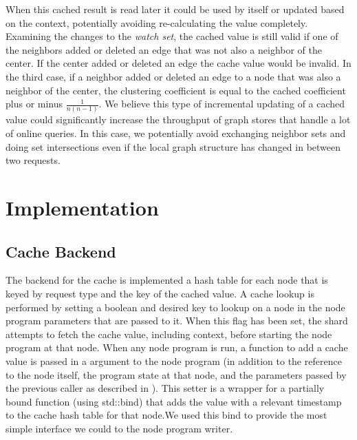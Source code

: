 \documentclass[letterpaper,twocolumn,11pt,tight]{article}
\begin{document}
    When this cached result is read later it could be used by itself or updated based on the context, potentially avoiding re-calculating the value completely. Examining the changes to the \emph{watch set}, the cached value is still valid if one of the neighbors added or deleted an edge that was not also a neighbor of the center. If the center added or deleted an edge the cache value would be invalid. In the third case, if a neighbor added or deleted an edge to a node that was also a neighbor of the center, the clustering coefficient is equal to the cached coefficient plus or minus $\frac1{n(n-1)}$. 
We believe this type of incremental updating of a cached value could significantly increase the throughput of graph stores that handle a lot of online queries. In this case, we potentially avoid exchanging neighbor sets and doing set intersections even if the local graph structure has changed in between two requests.

\section{Implementation}\label{sec:design}
\subsection{Cache Backend}
The backend for the cache is implemented a hash table for each node that is keyed by request type and the key of the cached value. A cache lookup is performed by setting a boolean and desired key to lookup on a node in the node program parameters that are passed to it.
When this flag has been set, the shard attempts to fetch the cache value, including context, before starting the node program at that node. When any node program is run, a function to add a cache value is passed in a argument to the node program (in addition to the reference to the node itself, the program state at that node, and the parameters passed by the previous caller as described in ). This setter is a wrapper for a partially bound function (using std::bind) that adds the value with a relevant timestamp to the cache hash table for that node.We used this bind to provide the most simple interface we could to the node program writer. 
\end{document}

